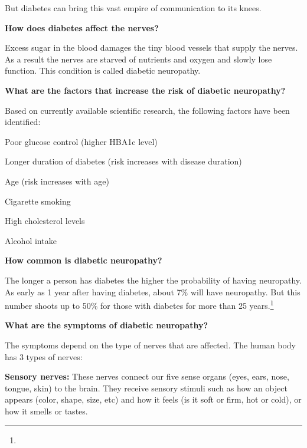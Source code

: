 { But diabetes can bring this vast empire of communication to its knees.

\textbf{How does diabetes affect the nerves?}

Excess sugar in the blood damages the tiny blood vessels that supply the nerves. As a result the nerves are starved of nutrients and oxygen and slowly lose function. This condition is called diabetic neuropathy.

\textbf{What are the factors that increase the risk of diabetic neuropathy?}

Based on currently available scientific research, the following factors have been identified:

\item Poor glucose control (higher HBA1c level)

 \item Longer duration of diabetes (risk increases with disease duration)

 \item Age (risk increases with age)

 \item Cigarette smoking

 \item High cholesterol levels

 \item Alcohol intake

\textbf{How common is diabetic neuropathy?}

 The longer a person has diabetes the higher the probability of having neuropathy. As early as 1 year after having diabetes, about 7\% will have neuropathy. But this number shoots up to 50\% for those with diabetes for more than 25 years.\footnote{}

\textbf{What are the symptoms of diabetic neuropathy?}

The symptoms depend on the type of nerves that are affected. The human body has 3 types of nerves:

\item \textbf{Sensory nerves:} These nerves connect our five sense organs (eyes, ears, nose, tongue, skin) to the brain. They receive sensory stimuli such as how an object appears (color, shape, size, etc) and how it feels (is it soft or firm, hot or cold), or how it smells or tastes.

}
